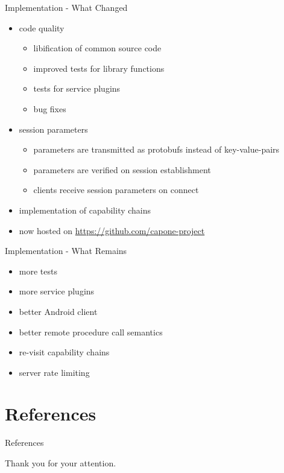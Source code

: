 \documentclass[a4paper]{beamer}
\begin{document}
\begin{frame}{Implementation - What Changed}
    \begin{itemize}
        \item code quality
            \begin{itemize}
                \item libification of common source code
                \item improved tests for library functions
                \item tests for service plugins
                \item bug fixes
            \end{itemize}
        \item session parameters
            \begin{itemize}
                \item parameters are transmitted as protobufs instead of key-value-pairs
                \item parameters are verified on session establishment
                \item clients receive session parameters on connect
            \end{itemize}
        \item implementation of capability chains
        \item now hosted on \url{https://github.com/capone-project}
    \end{itemize}
\end{frame}

\begin{frame}{Implementation - What Remains}
    \begin{itemize}
        \item more tests
        \item more service plugins
        \item better Android client
        \item better remote procedure call semantics
        \item re-visit capability chains
        \item server rate limiting
    \end{itemize}
\end{frame}

\section{References}

\begin{frame}[allowframebreaks]{References}
    
    {\Tiny }
\end{frame}

\begin{frame}[plain]
    \begin{center}
        Thank you for your attention.
    \end{center}
\end{frame}
\end{document}
